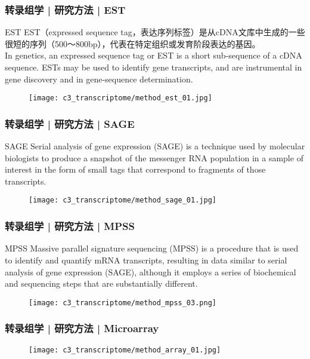 \begin{frame}
  \frametitle{转录组学 | 研究方法 | EST}
  {\footnotesize
  \begin{block}{EST}
    EST（expressed sequence tag，表达序列标签）是从cDNA文库中生成的一些很短的序列（500～800bp），代表在特定组织或发育阶段表达的基因。\\
    \vspace{0.2em}
    In genetics, an expressed sequence tag or EST is a short sub-sequence of a cDNA sequence. ESTs may be used to identify gene transcripts, and are instrumental in gene discovery and in gene-sequence determination.
  \end{block}
  }
  \begin{figure}
    \centering
    \texttt{[image: c3\_transcriptome/method\_est\_01.jpg]}
  \end{figure}
\end{frame}

\begin{frame}
  \frametitle{转录组学 | 研究方法 | SAGE}
  \begin{block}{SAGE}
    Serial analysis of gene expression (SAGE) is a technique used by molecular biologists to produce a snapshot of the messenger RNA population in a sample of interest in the form of small tags that correspond to fragments of those transcripts.
  \end{block}
  \begin{figure}
    \centering
    \texttt{[image: c3\_transcriptome/method\_sage\_01.jpg]}
  \end{figure}
\end{frame}

\begin{frame}
  \frametitle{转录组学 | 研究方法 | MPSS}
  {\footnotesize
  \begin{block}{MPSS}
    Massive parallel signature sequencing (MPSS) is a procedure that is used to identify and quantify mRNA transcripts, resulting in data similar to serial analysis of gene expression (SAGE), although it employs a series of biochemical and sequencing steps that are substantially different.
  \end{block}
  }
  \begin{figure}
    \centering
    \texttt{[image: c3\_transcriptome/method\_mpss\_03.png]}
  \end{figure}
\end{frame}

\begin{frame}
  \frametitle{转录组学 | 研究方法 | Microarray}
  \begin{figure}
    \centering
    \texttt{[image: c3\_transcriptome/method\_array\_01.jpg]}
  \end{figure}
\end{frame}

